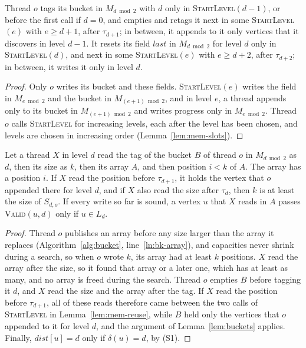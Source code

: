 \begin{lemma}[Reuse]
\label{lem:mem-reuse}
Thread $o$ tags its bucket in $M_{d \bmod 2}$ with $d$ only in \textsc{StartLevel}$(d-1)$, or before the first call if $d = 0$, and empties and retags it next in some \textsc{StartLevel}$(e)$ with $e \geq d+1$, after $\tau_{d+1}$; in between, it appends to it only vertices that it discovers in level $d-1$. It resets its field $\mathit{last}$ in $M_{d \bmod 2}$ for level $d$ only in \textsc{StartLevel}$(d)$, and next in some \textsc{StartLevel}$(e)$ with $e \geq d+2$, after $\tau_{d+2}$; in between, it writes it only in level $d$.
\end{lemma}
\begin{proof}
Only $o$ writes its bucket and these fields. \textsc{StartLevel}$(e)$ writes the field in $M_{e \bmod 2}$ and the bucket in $M_{(e+1) \bmod 2}$, and in level $e$, a thread appends only to its bucket in $M_{(e+1) \bmod 2}$ and writes progress only in $M_{e \bmod 2}$. Thread $o$ calls \textsc{StartLevel} for increasing levels, each after the level has been chosen, and levels are chosen in increasing order (Lemma~\ref{lem:mem-slots}).
\end{proof}

\begin{lemma}
\label{lem:mem-reads}
Let a thread $X$ in level $d$ read the tag of the bucket $B$ of thread $o$ in $M_{d \bmod 2}$ as $d$, then its size as $k$, then its array $A$, and then position $i < k$ of $A$. The array has a position $i$. If $X$ read the position before $\tau_{d+1}$, it holds the vertex that $o$ appended there for level $d$, and if $X$ also read the size after $\tau_d$, then $k$ is at least the size of $S_{d,o}$. If every write so far is sound, a vertex $u$ that $X$ reads in $A$ passes \textsc{Valid}$(u, d)$ only if $u \in L_d$.
\end{lemma}
\begin{proof}
Thread $o$ publishes an array before any size larger than the array it replaces (Algorithm~\ref{alg:bucket}, line~\ref{ln:bk-array}), and capacities never shrink during a search, so when $o$ wrote $k$, its array had at least $k$ positions. $X$ read the array after the size, so it found that array or a later one, which has at least as many, and no array is freed during the search. Thread $o$ empties $B$ before tagging it $d$, and $X$ read the size and the array after the tag. If $X$ read the position before $\tau_{d+1}$, all of these reads therefore came between the two calls of \textsc{StartLevel} in Lemma~\ref{lem:mem-reuse}, while $B$ held only the vertices that $o$ appended to it for level $d$, and the argument of Lemma~\ref{lem:buckets} applies. Finally, $\mathit{dist}[u] = d$ only if $\delta(u) = d$, by (S1).
\end{proof}

